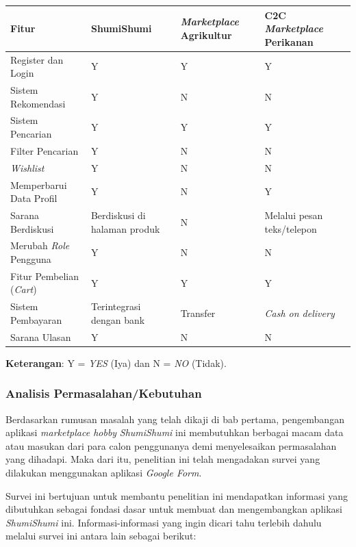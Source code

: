 \documentclass[a4paper]{article}
\newcommand{\subsubbab}[1]{%
    \subsubsection{#1}%
}
\begin{document}
\begin{centering}
\begin{longtable}{|p{3cm}|p{2cm}|p{3cm}|p{4cm}|}
    \hline
    Fitur & ShumiShumi & \textit{Marketplace} Agrikultur & C2C \textit{Marketplace} Perikanan\\
    \hline
    Register dan Login & Y & Y & Y\\
    \hline
    Sistem Rekomendasi & Y & N & N\\
    \hline
    Sistem Pencarian & Y & Y & Y\\
    \hline
    Filter Pencarian & Y & N & N\\
    \hline
    \textit{Wishlist} & Y & N & N\\
    \hline
    Memperbarui Data Profil & Y & N & Y\\
    \hline
    Sarana Berdiskusi & Berdiskusi di halaman produk & N & Melalui pesan teks/telepon\\
    \hline
    Merubah \textit{Role} Pengguna & Y & N & N\\
    \hline
    Fitur Pembelian (\textit{Cart}) & Y & Y & Y\\
    \hline
    Sistem Pembayaran & Terintegrasi dengan bank & Transfer & \textit{Cash on delivery}\\
    \hline
    Sarana Ulasan & Y & N & N\\
    \hline
\end{longtable}
\end{centering}

\textbf{Keterangan}: Y = \textit{YES} (Iya) dan N = \textit{NO} (Tidak).

\subsubbab{Analisis Permasalahan/Kebutuhan}
Berdasarkan rumusan masalah yang telah dikaji di bab pertama, pengembangan aplikasi \textit{marketplace hobby} \textit{ShumiShumi} ini membutuhkan berbagai macam data atau masukan dari para calon penggunanya demi menyelesaikan permasalahan yang dihadapi. Maka dari itu, penelitian ini telah mengadakan survei yang dilakukan menggunakan aplikasi \textit{Google Form}.

Survei ini bertujuan untuk membantu penelitian ini mendapatkan informasi yang dibutuhkan sebagai fondasi dasar untuk membuat dan mengembangkan aplikasi \textit{ShumiShumi} ini. Informasi-informasi yang ingin dicari tahu terlebih dahulu melalui survei ini antara lain sebagai berikut:
\end{document}
